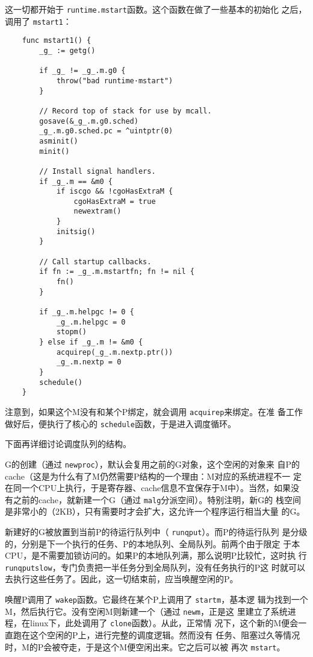 \documentclass[UTF8,b5paper,fontset=adobe]{ctexart}
\begin{document}
这一切都开始于 \verb+runtime.mstart+函数。这个函数在做了一些基本的初始化
之后，调用了 \verb+mstart1+：

\begin{verbatim}
    func mstart1() {
        _g_ := getg()

        if _g_ != _g_.m.g0 {
            throw("bad runtime·mstart")
        }

        // Record top of stack for use by mcall.
        gosave(&_g_.m.g0.sched)
        _g_.m.g0.sched.pc = ^uintptr(0)
        asminit()
        minit()

        // Install signal handlers.
        if _g_.m == &m0 {
            if iscgo && !cgoHasExtraM {
                cgoHasExtraM = true
                newextram()
            }
            initsig()
        }

        // Call startup callbacks.
        if fn := _g_.m.mstartfn; fn != nil {
            fn()
        }

        if _g_.m.helpgc != 0 {
            _g_.m.helpgc = 0
            stopm()
        } else if _g_.m != &m0 {
            acquirep(_g_.m.nextp.ptr())
            _g_.m.nextp = 0
        }
        schedule()
    }
\end{verbatim}

注意到，如果这个M没有和某个P绑定，就会调用 \verb+acquirep+来绑定。在准
备工作做好后，便执行了核心的 \verb+schedule+函数，于是进入调度循环。

下面再详细讨论调度队列的结构。

G的创建（通过 \verb+newproc+），默认会复用之前的G对象，这个空闲的对象来
自P的cache（这是为什么有了M仍然需要P结构的一个理由：M对应的系统进程不一
定在同一个CPU上执行，于是寄存器、cache信息不宜保存于M中）。当然，如果没
有之前的cache，就新建一个G（通过 \verb+malg+分派空间）。特别注明，新G的
栈空间是非常小的（2KB），只有需要时才会扩大，这允许一个程序运行相当大量
的G。

新建好的G被放置到当前P的待运行队列中（ \verb+runqput+）。而P的待运行队列
是分级的，分别是下一个执行的任务、P的本地队列、全局队列。前两个由于限定
于本CPU，是不需要加锁访问的。如果P的本地队列满，那么说明P比较忙，这时执
行 \verb+runqputslow+，专门负责把一半任务分到全局队列，没有任务执行的P这
时就可以去执行这些任务了。因此，这一切结束前，应当唤醒空闲的P。

唤醒P调用了 \verb+wakep+函数。它最终在某个P上调用了 \verb+startm+，基本逻
辑为找到一个M，然后执行它。没有空闲M则新建一个（通过 \verb+newm+，正是这
里建立了系统进程，在linux下，此处调用了 \verb+clone+函数）。从此，正常情
况下，这个新的M便会一直跑在这个空闲的P上，进行完整的调度逻辑。然而没有
任务、阻塞过久等情况时，M的P会被夺走，于是这个M便空闲出来。它之后可以被
再次 \verb+mstart+。
\end{document}
